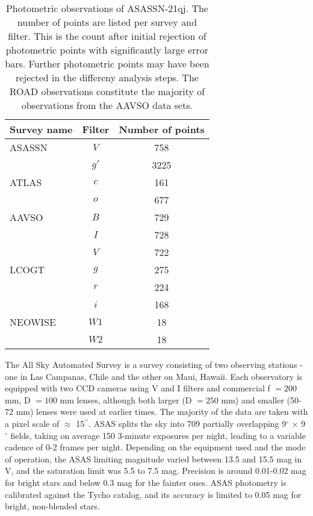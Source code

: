 \documentclass[sn-nature]{sn-jnl}%
\newcommand*\degr{\ensuremath{^\circ}}
\newcommand*\arcsec{\ensuremath{^{\prime\prime}}}
\begin{document}
\begin{table}
    \centering
    \caption{Photometric observations of ASASSN-21qj. The number of points are listed per survey and filter. %
    This is the count after initial rejection of photometric points with significantly large error bars.
    Further photometric points may have been rejected in the differeny analysis steps.
    The ROAD observations constitute the majority of observations from the AAVSO data sets.}
    \begin{tabular}{@{}lcc@{}}
    \hline\hline
Survey name  & Filter & Number of points                    \\
        \hline
ASASSN   &  $V$   & 758 \\
   &  $g'$   & 3225 \\
        \hline
ATLAS & $c$ & 161 \\
 & $o$ & 677 \\
        \hline
AAVSO   &  $B$   & 729 \\    %
   &  $I$   & 728 \\    %
   &  $V$   & 722 \\    %
        \hline
LCOGT   &  $g$   & 275 \\    %
   &  $r$   & 224 \\    %
   &  $i$   & 168 \\    %
        \hline
NEOWISE & $W1$ & 18 \\
 & $W2$ & 18 \\
        \hline
    \end{tabular}
 
\label{tab:photometry}
\end{table}

%
%
The All Sky Automated Survey \cite[ASAS; ][]{pojmanski_all_1997, asas_2005, asas_2018} is a survey consisting of two observing stations - one in Las Campanas, Chile and the other on Maui, Hawaii. 
%
Each observatory is equipped with two CCD cameras using V and I filters and commercial f $ = 200$ mm, D $= 100$ mm lenses, although both larger (D $=250$ mm) and smaller (50-72 mm) lenses were used at earlier times.
%
The majority of the data are taken with a pixel scale of $\approx$ 15\arcsec{}.
%
ASAS splits the sky into 709 partially overlapping 9\degr{} $\times$ 9\degr{} fields, taking on average 150 3-minute exposures per night, leading to a variable cadence of 0-2 frames per night.
%
Depending on the equipment used and the mode of operation, the ASAS limiting magnitude varied between 13.5 and 15.5 mag in V, and the saturation limit was 5.5 to 7.5 mag. 
%
Precision is around 0.01-0.02 mag for bright stars and below 0.3 mag for the fainter ones. 
%
ASAS photometry is calibrated against the Tycho catalog, and its accuracy is limited to 0.05 mag for bright, non-blended stars.
\end{document}
